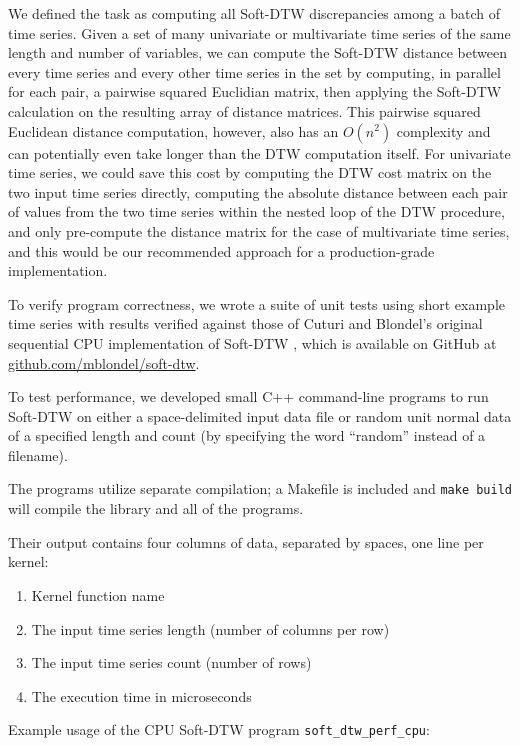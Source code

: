 \documentclass[12pt, letterpaper]{article}
\begin{document}
We defined the task as computing all Soft-DTW discrepancies among a batch of
time series. Given a set of many univariate or multivariate time series of the
same length and number of variables, we can compute the Soft-DTW distance
between every time series and every other time series in the set by computing,
in parallel for each pair, a pairwise squared Euclidian matrix, then applying
the Soft-DTW calculation on the resulting array of distance matrices. This
pairwise squared Euclidean distance computation, however, also has an $O(n^2)$
complexity and can potentially even take longer than the DTW computation
itself. For univariate time series, we could save this cost by computing the DTW
cost matrix on the two input time series directly, computing the absolute
distance between each pair of values from the two time series within the nested
loop of the DTW procedure, and only pre-compute the distance matrix for the case
of multivariate time series, and this would be our recommended approach for a
production-grade implementation.

To verify program correctness, we wrote a suite of unit tests using short
example time series with results verified against those of Cuturi and Blondel's
original sequential CPU implementation of Soft-DTW \cite{cuturi_soft-dtw_2018},
which is available on GitHub at
\href{https://github.com/mblondel/soft-dtw}{github.com/mblondel/soft-dtw}.

To test performance, we developed small C++ command-line programs to run
Soft-DTW on either a space-delimited input data file or random unit normal data
of a specified length and count (by specifying the word ``random'' instead of a
filename).

The programs utilize separate compilation; a Makefile is included and
\verb|make build| will compile the library and all of the programs.

Their output contains four columns of data, separated by spaces, one line per
kernel:

\begin{enumerate}
  \item Kernel function name
  \item The input time series length (number of columns per row)
  \item The input time series count (number of rows)
  \item The execution time in microseconds
\end{enumerate}

Example usage of the CPU Soft-DTW program \verb|soft_dtw_perf_cpu|:
\end{document}
